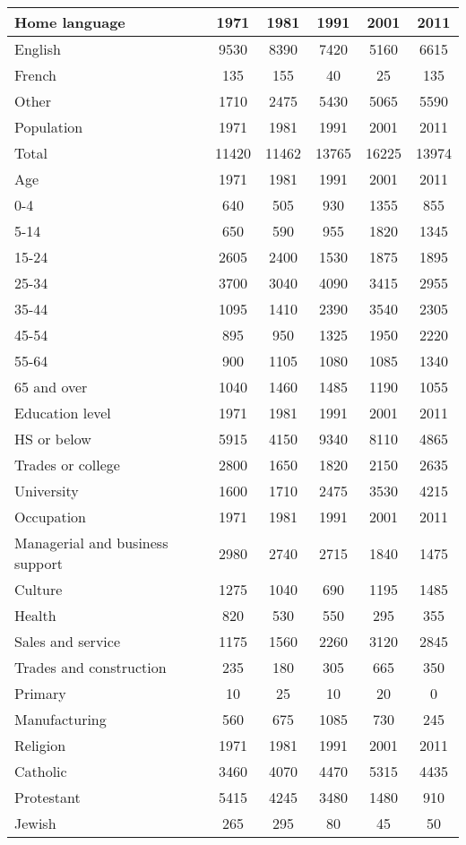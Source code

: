 \begin{tabular}{lccccc}
	\hline
	Home language&1971&1981&1991&2001&2011\\
	\hline
	 English & 9530&8390&7420&5160&6615 \\
	 French & 135&155&40&25&135 \\
	 Other & 1710&2475&5430&5065&5590 \\
	\hline
	Population&1971&1981&1991&2001&2011\\
	\hline
	 Total & 11420&11462&13765&16225&13974 \\
	\hline
	Age&1971&1981&1991&2001&2011\\
	\hline
	 0-4 & 640&505&930&1355&855 \\
	 5-14 & 650&590&955&1820&1345 \\
	 15-24 & 2605&2400&1530&1875&1895 \\
	 25-34 & 3700&3040&4090&3415&2955 \\
	 35-44 & 1095&1410&2390&3540&2305 \\
	 45-54 & 895&950&1325&1950&2220 \\
	 55-64 & 900&1105&1080&1085&1340 \\
	 65 and over & 1040&1460&1485&1190&1055 \\
	\hline
	Education level&1971&1981&1991&2001&2011\\
	\hline
	 HS or below & 5915&4150&9340&8110&4865 \\
	 Trades or college & 2800&1650&1820&2150&2635 \\
	 University & 1600&1710&2475&3530&4215 \\
	\hline
	Occupation&1971&1981&1991&2001&2011\\
	\hline
	 Managerial and business support & 2980&2740&2715&1840&1475 \\
	 Culture & 1275&1040&690&1195&1485 \\
	 Health & 820&530&550&295&355 \\
	 Sales and service & 1175&1560&2260&3120&2845 \\
	 Trades and construction & 235&180&305&665&350 \\
	 Primary & 10&25&10&20&0 \\
	 Manufacturing & 560&675&1085&730&245 \\
	\hline
	Religion&1971&1981&1991&2001&2011\\
	\hline
	 Catholic & 3460&4070&4470&5315&4435 \\
	 Protestant & 5415&4245&3480&1480&910 \\
	 Jewish & 265&295&80&45&50 \\

\end{tabular}
